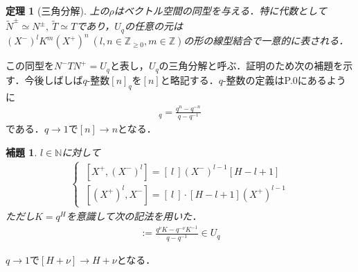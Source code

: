 \documentclass[dvipdfmx]{jsarticle}
\newtheorem{theorem}{定理}[section]%
\newtheorem{lemma}{補題}[section]
\begin{document}
%
%
%
\setcounter{section}{2}
\setcounter{theorem}{6}
\begin{theorem}[三角分解]
上の$\rho$はベクトル空間の同型を与える．特に代数として$\widetilde{N}^\pm\simeq N^\pm,{\ }\widetilde{T}\simeq T$であり，$U_q$の任意の元は$(X^-)^lK^m(X^+)^n{\ }(l,n\in\mathbb{Z}_{\geq 0},m\in\mathbb{Z})$の形の線型結合で一意的に表される．
\end{theorem}
この同型を$N^-TN^+=U_q$と表し，$U_q$の三角分解と呼ぶ．証明のため次の補題を示す．今後しばしば$q$-整数$[n]_q$を$[n]$と略記する．$q$-整数の定義はP.0にあるように
\begin{align*}
[n]_q=\frac{q^n-q^{-n}}{q-q^{-1}}
\end{align*}
である．$q\to 1$で$[n]\to n$となる．
%
%
%
\setcounter{lemma}{7}
\begin{lemma}
$l\in\mathbb{N}$に対して
\begin{align*}
\begin{cases}
{\ }[X^+,(X^-)^l]=[{\ }l{\ }](X^-)^{l-1}[H-l+1] \\
{\ }[(X^+)^l,X^-]=[{\ }l{\ }]\cdot[H-l+1](X^+)^{l-1}
\end{cases}
\end{align*}
ただし$K=q^H$を意識して次の記法を用いた．
\begin{align*}
[H+\nu]:=\frac{q^\nu K-q^{-\nu}K^{-1}}{q-q^{-1}}\in U_q
\end{align*}
\end{lemma}
$q\to 1$で$[H+\nu]\to H+\nu$となる．
%
%
%
%
\end{document}
